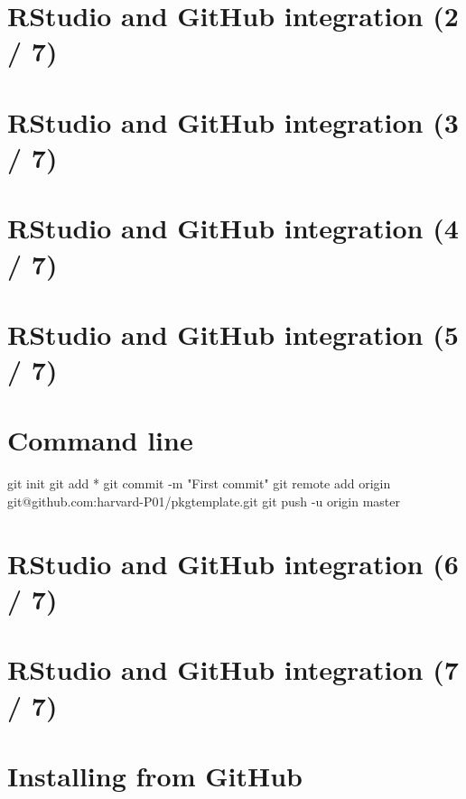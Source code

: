 \documentclass[]{book}
\newenvironment{Shaded}{\begin{snugshade}}{\end{snugshade}}
\newcommand{\StringTok}[1]{\textcolor[rgb]{0.31,0.60,0.02}{{#1}}}
\newcommand{\NormalTok}[1]{{#1}}
\theoremstyle{definition}
\theoremstyle{definition}
\theoremstyle{definition}
\theoremstyle{remark}
\begin{document}
\section{RStudio and GitHub integration (2 /
7)}\label{rstudio-and-github-integration-2-7}

\section{RStudio and GitHub integration (3 /
7)}\label{rstudio-and-github-integration-3-7}

\section{RStudio and GitHub integration (4 /
7)}\label{rstudio-and-github-integration-4-7}

\section{RStudio and GitHub integration (5 /
7)}\label{rstudio-and-github-integration-5-7}

\section{Command line}\label{command-line}

\begin{Shaded}
\begin{Highlighting}[]
\NormalTok{git init}
\NormalTok{git add *}
\NormalTok{git commit -m }\StringTok{"First commit"}
\NormalTok{git remote add origin git@github.com:harvard-P01/pkgtemplate.git}
\NormalTok{git push -u origin master}
\end{Highlighting}
\end{Shaded}

\section{RStudio and GitHub integration (6 /
7)}\label{rstudio-and-github-integration-6-7}

\section{RStudio and GitHub integration (7 /
7)}\label{rstudio-and-github-integration-7-7}

\section{Installing from GitHub}\label{installing-from-github}
\end{document}
